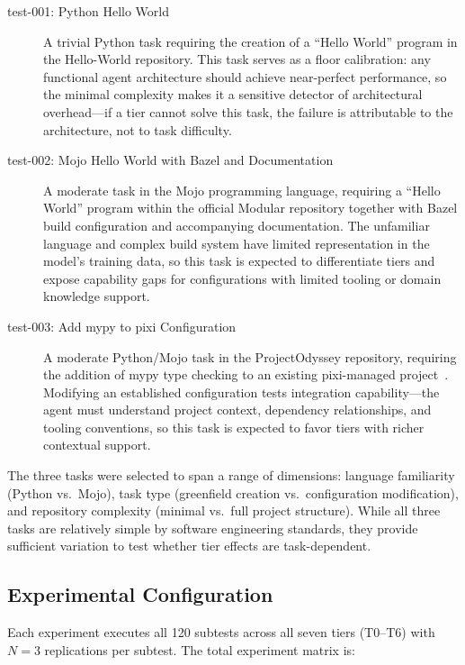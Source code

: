 \documentclass[11pt]{article}
\begin{document}
\begin{description}
  \item[test-001: Python Hello World] A trivial Python task requiring the
    creation of a ``Hello World'' program in the Hello-World repository. This
    task serves as a floor calibration: any functional agent architecture
    should achieve near-perfect performance, so the minimal complexity makes
    it a sensitive detector of architectural overhead---if a tier cannot solve
    this task, the failure is attributable to the architecture, not to task
    difficulty.
  \item[test-002: Mojo Hello World with Bazel and Documentation] A moderate
    task in the Mojo programming language, requiring a ``Hello World'' program
    within the official Modular repository together with Bazel build
    configuration and accompanying documentation. The unfamiliar language and
    complex build system have limited representation in the model's training
    data, so this task is expected to differentiate tiers and expose capability
    gaps for configurations with limited tooling or domain knowledge support.
  \item[test-003: Add mypy to pixi Configuration] A moderate Python/Mojo
    task in the ProjectOdyssey repository, requiring the addition of mypy
    type checking to an existing pixi-managed
    project~\cite{projectodyssey}. Modifying an established configuration
    tests integration capability---the agent must understand project context,
    dependency relationships, and tooling conventions, so this task is
    expected to favor tiers with richer contextual support.
\end{description}

The three tasks were selected to span a range of dimensions: language
familiarity (Python vs.\ Mojo), task type (greenfield creation vs.\
configuration modification), and repository complexity (minimal vs.\ full
project structure). While all three tasks are relatively simple by software
engineering standards, they provide sufficient variation to test whether tier
effects are task-dependent.

\subsection{Experimental Configuration}
\label{sec:exp_config}

Each experiment executes all 120 subtests across all seven tiers (T0--T6) with
$N=3$ replications per subtest. The total experiment matrix is:
\end{document}
